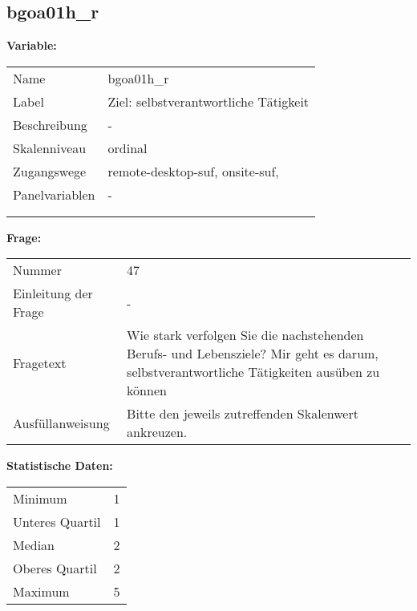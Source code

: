 	
	
	\subsection{bgoa01h\_r}
	\label{subSection:bgoa01h_r}

	\noindent\textbf{Variable:}\\
		\begin{tabular}{lL{11.3cm}}
			\label{tableVariable:bgoa01h_r}
			Name & bgoa01h\_r \\
			Label & Ziel: selbstverantwortliche Tätigkeit \\
			Beschreibung & - \\
			Skalenniveau & ordinal \\
			Zugangswege &
				remote-desktop-suf,
				onsite-suf,
 \\
			Panelvariablen & -
			 \\
			 \\
 \\
		\end{tabular}

		\vspace*{1 cm}
		\noindent\textbf{Frage:}\\
		\begin{tabular}{lL{11.3cm}}
			\label{tableQuestion:bgoa01h_r}
			Nummer & 47 \\
			Einleitung der Frage & - \\
			Fragetext & Wie stark verfolgen Sie die nachstehenden Berufs- und Lebensziele?
Mir geht es darum, selbstverantwortliche Tätigkeiten ausüben zu können \\
			Ausfüllanweisung & Bitte den jeweils zutreffenden Skalenwert ankreuzen. \\
		\end{tabular}


		\vspace*{1 cm}
		\noindent\textbf{Statistische Daten:}\\
			\begin{tabular}{ll}
				\label{tableStatistics:bgoa01h_r}
					Minimum & 1 \\
					Unteres Quartil & 1 \\
					Median & 2 \\
					Oberes Quartil & 2 \\
					Maximum & 5 \\
			\end{tabular}



